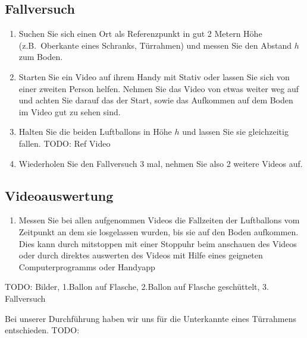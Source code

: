 \documentclass{article}
\begin{document}
        \subsection{Fallversuch}
            \begin{enumerate}[resume]
                \item Suchen Sie sich einen Ort als Referenzpunkt in gut 2 Metern Höhe (z.B.\ Oberkante eines Schranks, Türrahmen) und messen Sie
                den Abstand \(h\) zum Boden.
                \item Starten Sie ein Video auf ihrem Handy mit Stativ oder lassen Sie sich von einer zweiten Person helfen.
                Nehmen Sie das Video von etwas weiter weg auf und achten Sie darauf das der Start, sowie das Aufkommen auf dem Boden im Video gut zu sehen sind.
                \item Halten Sie die beiden Luftballons in Höhe \(h\) und lassen Sie sie gleichzeitig fallen. TODO: Ref Video
                \item Wiederholen Sie den Fallversuch 3 mal, nehmen Sie also 2 weitere Videos auf.
            \end{enumerate}
            
        \subsection{Videoauswertung}
            \begin{enumerate}
                \item Messen Sie bei allen aufgenommen Videos die Fallzeiten der Luftballons vom Zeitpunkt an dem sie losgelassen wurden, bis sie auf den Boden aufkommen.
                Dies kann durch mitstoppen mit einer Stoppuhr beim anschauen des Videos oder durch direktes auswerten des Videos mit Hilfe eines geigneten Computerprogramms oder Handyapp
            \end{enumerate}
        TODO: Bilder, 1.Ballon auf Flasche, 2.Ballon auf Flasche geschüttelt, 3. Fallversuch

        Bei unserer Durchführung haben wir uns für die Unterkannte eines Türrahmens entschieden. TODO:
    
\end{document}
